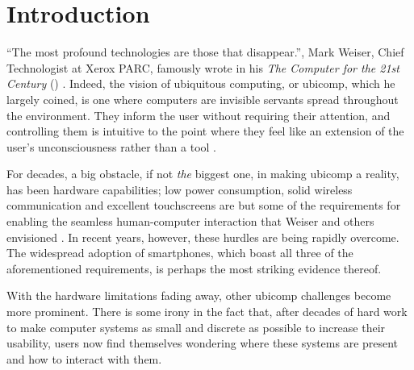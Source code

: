 \documentclass[a4paper,fancychapters]{article}
\begin{document}
	
\section{Introduction} \label{sec:introduction}
``The most profound technologies are those that disappear.'', Mark Weiser, Chief Technologist at Xerox PARC, famously wrote in his \textit{The Computer for the 21st Century} (\citeyear{weiser1991computer}) \cite{weiser1991computer}. Indeed, the vision of ubiquitous computing, or ubicomp, which he largely coined, is one where computers are invisible servants spread throughout the environment. They inform the user without requiring their attention, and controlling them is intuitive to the point where they feel like an extension of the user's unconsciousness rather than a tool \cite{weiser1997coming}. %

For decades, a big obstacle, if not \textit{the} biggest one, in making ubicomp a reality, has been hardware capabilities; low power consumption, solid wireless communication and excellent touchscreens are but some of the requirements for enabling the seamless human-computer interaction that Weiser and others envisioned \cite{weiser1993some}. In recent years, however, these hurdles are being rapidly overcome. The widespread adoption of smartphones, which boast all three of the aforementioned requirements, is perhaps the most striking evidence thereof.

With the hardware limitations fading away, other ubicomp challenges become more prominent. %
There is some irony in the fact that, after decades of hard work to make computer systems as small and discrete as possible to increase their usability, users now find themselves wondering where these systems are present and how to interact with them.




\end{document}
